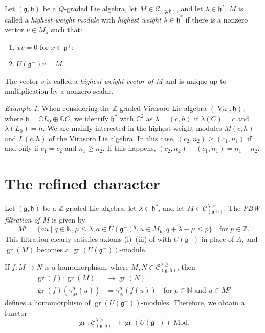 \documentclass[a4paper, 12pt, reqno]{amsart}
\theoremstyle{remark}
\newtheorem{example}[theorem]{Example}
\DeclareMathOperator{\Vir}{Vir}
\DeclareMathOperator{\gr}{gr}
\begin{document}
Let $(\mathfrak{g}, \mathfrak{h})$ be a $Q$-graded Lie algebra, let $M \in \mathcal{C}_{(\mathfrak{g}, \mathfrak{h})}$, and let $\lambda \in \mathfrak{h}^*$.
$M$ is called a \emph{highest weight module} with \emph{highest weight} $\lambda \in \mathfrak{h}^*$ if there is a nonzero vector $v \in M_{\lambda}$ such that:
\begin{enumerate}
\item $xv = 0$ for $x \in \mathfrak{g}^+$;
\item $U(\mathfrak{g}^-)v = M$.
\end{enumerate}
The vector $v$ is called a \emph{highest weight vector of $M$} and is unique up to multiplication by a nonzero scalar.

\begin{example}
  \label{exa:5}
  When considering the $\mathbb{Z}$-graded Virasoro Lie algebra $(\Vir, \mathfrak{h})$, where $\mathfrak{h} = \mathbb{C}L_0 \oplus \mathbb{C}C$, we identify $\mathfrak{h}^*$ with $\mathbb{C}^2$ as $\lambda = (c, h)$ if $\lambda(C) = c$ and $\lambda(L_0) = h$.
  We are mainly interested in the highest weight modules $M(c, h)$ and $L(c, h)$ of the Virasoro Lie algebra.
  In this case, $(c_2, n_2) \ge (c_1, n_1)$ if and only if $c_1 = c_2$ and $n_1 \ge n_2$.
  If this happens, $(c_2, n_2) - (c_1, n_1) = n_1 - n_2$.
\end{example}

\section{The refined character}
\label{sec:refined-character}

Let $(\mathfrak{g}, \mathfrak{h})$ be a $\mathbb{Z}$-graded Lie algebra, let $\lambda \in \mathfrak{h}^*$, and let $M \in \mathcal{C}^{\lambda \ge}_{(\mathfrak{g}, \mathfrak{h})}$.
The \emph{PBW filtration of $M$} is given by
\begin{equation*}
  M^p = \{au \mid q \in \mathbb{N}, \mu \le \lambda, a \in U(\mathfrak{g}^-)^q, u \in M_{\mu}, q + \lambda - \mu \le p\} \quad \text{for $p \in \mathbb{Z}$}.
\end{equation*}
This filtration clearly satisfies axioms (i)--(iii) of  with $U(\mathfrak{g}^-)$ in place of $A$, and $\gr(M)$ becomes a $\gr(U(\mathfrak{g^-}))$-module.

If $f: M \to N$ is a homomorphism, where $M, N \in \mathcal{C}^{\lambda \ge}_{(\mathfrak{g}, \mathfrak{h})}$, then
\begin{align*}
  \gr(f): \gr(M) &\to \gr(N), \\
  \gr(f)(\gamma_M^p(u)) &= \gamma_N^p(f(u)) \quad \text{for $p \in \mathbb{N}$ and $u \in M^p$}
\end{align*}
defines a homomorphism of $\gr(U(\mathfrak{g}^-))$-modules.
Therefore, we obtain a functor
\begin{equation*}
  \gr: \mathcal{C}^{\lambda \ge}_{(\mathfrak{g}, \mathfrak{h})} \to \gr(U(\mathfrak{g}^-))\text{-Mod}.
\end{equation*}
\end{document}
